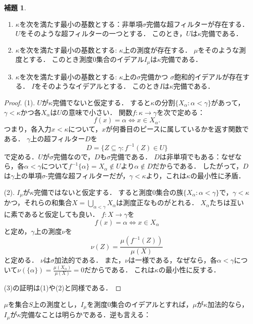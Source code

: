 \documentclass[uplatex]{jsarticle}
\renewcommand\subset{\subseteq}
\theoremstyle{definition}
\newtheorem{lem}[thm]{補題}
\begin{document}
	\begin{lem}
		\begin{enumerate}
			\item $\kappa$を次を満たす最小の基数とする：非単項$\sigma$完備な超フィルターが存在する．
			$U$をそのような超フィルターの一つとする．
			このとき，$U$は$\kappa$完備である．
			\item $\kappa$を次を満たす最小の基数とする: $\kappa$上の測度が存在する．
			$\mu$をそのような測度とする．
			このとき測度$0$集合のイデアル$I_\mu$は$\kappa$完備である．
			\item $\kappa$を次を満たす最小の基数とする: $\kappa$上の$\sigma$完備かつ $\sigma$飽和的イデアルが存在する．
			$I$をそのようなイデアルとする．
			このとき$I$は$\kappa$完備である．
		\end{enumerate}
	\end{lem}
	\begin{proof}
		(1). 
		$U$が$\kappa$完備でないと仮定する．
		すると$\kappa$の分割$\{ X_\alpha : \alpha < \gamma \}$があって，$\gamma < \kappa$かつ各$X_\alpha$は$U$の意味で小さい．
		関数$f \colon \kappa \to \gamma$を次で定める：
		\[
		f(x) = \alpha \iff x \in X_\alpha.
		\]
		つまり，各入力$x < \kappa$について，$x$が何番目のピースに属しているかを返す関数である．
		$\gamma$上の超フィルター$D$を
		\[
		D = \{ Z \subset \gamma : f^{-1}(Z) \in U \}
		\]
		で定める．$U$が$\sigma$完備なので，$D$も$\sigma$完備である．
		$D$は非単項でもある：なぜなら，各$\alpha < \gamma$について$f^{-1}\{\alpha\} = X_\alpha \not \in U$より$\alpha \not \in D$だからである．
		したがって，$D$は$\gamma$上の単項$\sigma$-完備な超フィルターだが，$\gamma < \kappa$より，これは$\kappa$の最小性に矛盾．
		
		(2). $I_\mu$が$\kappa$完備ではないと仮定する．
		すると測度$0$集合の族$\{X_\alpha : \alpha < \gamma \}$で，$\gamma < \kappa$かつ，それらの和集合$X = \bigcup_{\alpha < \gamma} X_\alpha$は測度正なものがとれる．
		$X_\alpha$たちは互いに素であると仮定しても良い．
		$f \colon X \to \gamma$を
		\[
		f(x) = \alpha \iff x \in X_\alpha
		\]
		と定め，$\gamma$上の測度$\nu$を
		\[
		\nu(Z) = \frac{\mu(f^{-1}(Z))}{\mu(X)} 
		\]
		と定める．
		$\nu$は$\sigma$加法的である．
		また，$\nu$は一様である，なぜなら，各$\alpha < \gamma$について$\nu(\{\alpha\}) = \frac{\mu(X_\alpha)}{\mu(X)} = 0$だからである．
		これは$\kappa$の最小性に反する．
		
		(3)の証明は(1)や(2)と同様である．
	\end{proof}
	
	$\mu$を集合$S$上の測度とし，$I_\mu$を測度$0$集合のイデアルとすれば，$\mu$が$\kappa$加法的なら，$I_\mu$が$\kappa$完備なことは明らかである．逆も言える：
	
\end{document}
